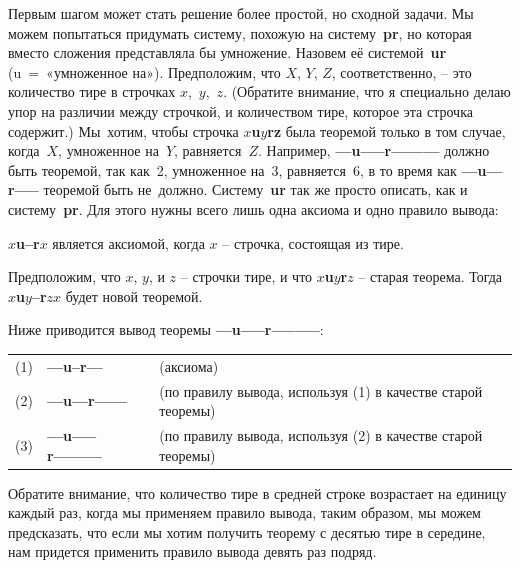 \documentclass[../main.tex]{subfiles}
\begin{document}
Первым шагом может стать решение более простой, но сходной задачи.
Мы можем попытаться придумать систему, похожую на систему~\textbf{pr}, но которая вместо сложения представляла бы умножение.
Назовем её системой~\textbf{ur} (u~=~«умноженное на»).
Предположим, что $X$, $Y$, $Z$, соответственно, \--- это количество тире в строчках $x$,~$y$,~$z$.
(Обратите внимание, что я специально делаю упор на различии между строчкой, и количеством тире, которое эта строчка содержит.)
Мы~хотим, чтобы строчка \textbf{$x$u$y$rz} была теоремой только в том случае, когда~$X$, умноженное на~$Y$, равняется~$Z$.
Например, \textbf{--{}--u--{}--{}--r--{}--{}--{}--{}--{}--} должно быть теоремой, так как~2, умноженное на~3, равняется~6, в то время как \textbf{--{}--u--{}--r--{}--{}--} теоремой быть не~должно.
Систему~\textbf{ur} так же просто описать, как и систему~\textbf{pr}.
Для этого нужны всего лишь одна аксиома и одно правило вывода:

\begin{tcolorbox}[title={СХЕМА АКСИОМ}]
    \textbf{$x$u--r$x$} является аксиомой, когда $x$ \--- строчка, состоящая из тире.
\end{tcolorbox}

\begin{tcolorbox}[title={ПРАВИЛО ВЫВОДА}]
    Предположим, что $x$, $y$, и $z$ \--- строчки тире, и что \textbf{$x$u$y$r$z$} \--- старая теорема.
    Тогда \textbf{$x$u$y$--r$zx$} будет новой теоремой.
\end{tcolorbox}

Ниже приводится вывод теоремы \textbf{--{}--u--{}--{}--r--{}--{}--{}--{}--{}--}:
\begin{center}
\begin{tabular}{r @{~} l @{~~} l}
    (1) & \textbf{--{}--u--r--{}--}
        & (аксиома) \\
    (2) & \textbf{--{}--u--{}--r--{}--{}--{}--}
        & (по правилу вывода, используя (1) в качестве старой теоремы) \\
    (3) & \textbf{--{}--u--{}--{}--r--{}--{}--{}--{}--{}--}
        & (по правилу вывода, используя (2) в качестве старой теоремы) \\
\end{tabular}
\end{center}
Обратите внимание, что количество тире в средней строке возрастает на единицу каждый раз, когда мы применяем правило вывода, таким образом, мы можем предсказать, что если мы хотим получить теорему с десятью тире в середине, нам придется применить правило вывода девять раз подряд.
\end{document}
